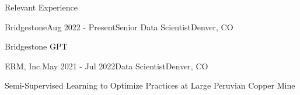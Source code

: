 \documentclass{resume} %
\newcommand{\commentblock}[1]{}
\begin{document}
\begin{rSection}{Relevant Experience}
\begin{rSubsection}{Bridgestone}{Aug 2022 - Present}{Senior Data Scientist}{Denver, CO}
        \item {Bridgestone GPT}
        \vspace{-0.5em}
        \commentblock{
            \vspace{-0.5em}
            \subitem{
                $\cdot$ Developed and deployed a user-friendly interface for 350+ teammates to query GPT LLMs for \\ \hspace*{2.25em} ideation and task generation
            }
            \subitem{$\cdot$ Powered a user friendly interface with several options of the GPT LLMs secured on our tenant}
            \vspace{-0.5em}
            \subitem{$\cdot$ The productionalized application enables 350+ teammates to submit queries to the underlying LLM \\ \hspace*{2.25em} in order to  ideate, generate, and promote a suite of creative and efficient tasks and goals}
        }
        \vspace{0.25em}
    \end{rSubsection} 

    \begin{rSubsection}{ERM, Inc.}{May 2021 - Jul 2022}{Data Scientist}{Denver, CO} 

    \item {Semi-Supervised Learning to Optimize Practices at Large Peruvian Copper Mine}
        \vspace{-0.5em}
        \vspace{-0.5em}
        \vspace{0.25em}


\end{rSubsection}
\end{rSection}
\end{document}
